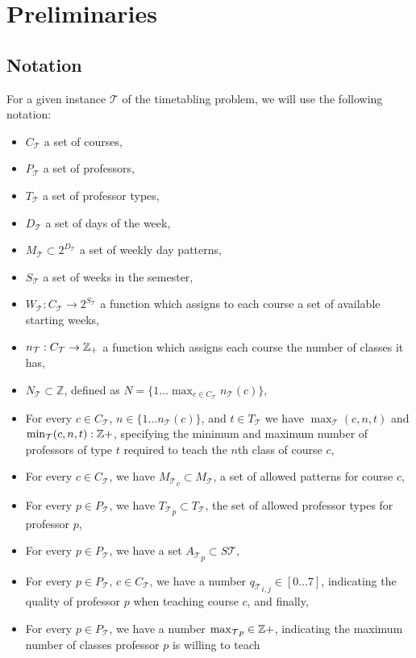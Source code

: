 \chapter{Preliminaries}

\section{Notation}
For a given instance $\mathcal{T}$ of the timetabling problem, we will use the following notation:
\begin{itemize}
\item $C_{\mathcal{T}}$ a set of courses,
\item $P_{\mathcal{T}}$ a set of professors,
\item $T_{\mathcal{T}}$ a set of professor types,
\item $D_{\mathcal{T}}$ a set of days of the week,
\item $M_{\mathcal{T}} \subset 2^{D_\mathcal{T}}$ a set of weekly day patterns,
\item $S_{\mathcal{T}}$ a set of weeks in the semester,
\item $W_{\mathcal{T}} : C_{\mathcal{T}} \to 2^{S_\mathcal{T}}$ a function which assigns to each course a set of available starting weeks,
\item $n_\mathcal{T}: C_\mathcal{T} \to \mathbb{Z}_+$ a function which assigns each course the number of classes it has,
\item $N_\mathcal{T} \subset \mathbb{Z}$, defined as $N = \{1 \dots \max_{c \in C_\mathcal{T}} n_\mathcal{T}(c)\}$,
\item For every $c \in C_\mathcal{T}$, $n \in \{1 \dots n_\mathcal{T}(c)\}$, and $t \in T_\mathcal{T}$ we have $\max_\mathcal{T}(c, n, t)$ and $\min_\mathcal{T}(c, n, t): \mathbb{Z}+$, specifying the minimum and maximum number of professors of type $t$ required to teach the $n$th class of course $c$,
\item For every $c \in C_\mathcal{T}$, we have ${M_\mathcal{T}}_c \subset M_\mathcal{T}$, a set of allowed patterns for course $c$,
\item For every $p \in P_\mathcal{T}$, we have ${T_\mathcal{T}}_p \subset T_\mathcal{T}$, the set of allowed professor types for professor $p$,
\item For every $p \in P_\mathcal{T}$, we have a set ${A_\mathcal{T}}_p \subset S \mathcal{T}$,
\item For every $p \in P_\mathcal{T}$, $c \in C_\mathcal{T}$, we have a number ${q_\mathcal{T}}_{i, j} \in [0 \dots 7]$, indicating the quality of professor $p$ when teaching course $c$, and finally,
\item For every $p \in P_\mathcal{T}$, we have a number ${\max_{\mathcal{T}}}_p \in \mathbb{Z}+$, indicating the maximum number of classes professor $p$ is willing to teach
\end{itemize}

